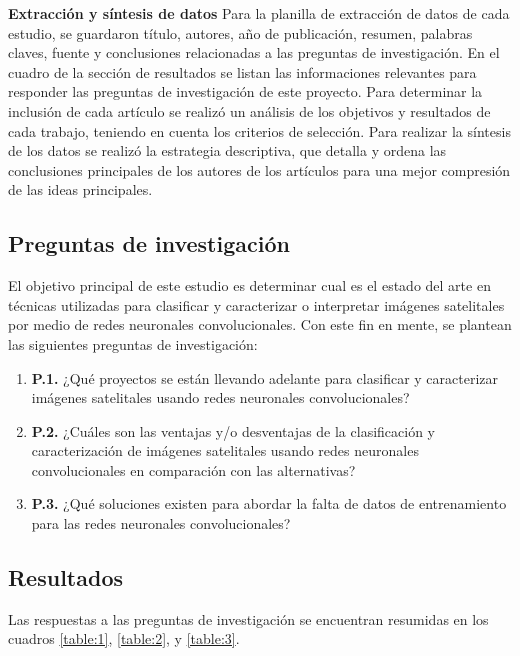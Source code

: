 {\bf Extracción y síntesis de datos} Para la planilla de extracción de datos de cada estudio, se guardaron título,
autores, año de publicación, resumen, palabras claves, fuente y conclusiones relacionadas a las preguntas de
investigación. En el cuadro de la sección de resultados se listan las informaciones relevantes para responder las
preguntas de investigación de este proyecto. Para determinar la inclusión de cada artículo se realizó un análisis de
los objetivos y resultados de cada trabajo, teniendo en cuenta los criterios de selección. Para realizar la síntesis de
los datos se realizó la estrategia descriptiva, que detalla y ordena las conclusiones principales de los autores de los
artículos para una mejor compresión de las ideas principales.

\subsection{Preguntas de investigación}

El objetivo principal de este estudio es determinar cual es el estado del arte en técnicas utilizadas para clasificar y
caracterizar o interpretar imágenes satelitales por medio de redes neuronales convolucionales. Con este fin en mente,
se plantean las siguientes preguntas de investigación:

\begin{enumerate}
    \item[] {\bf P.1.} ¿Qué proyectos se están llevando adelante para clasificar y caracterizar imágenes satelitales
        usando redes neuronales convolucionales?
    \item[] {\bf P.2.} ¿Cuáles son las ventajas y/o desventajas de la clasificación y caracterización de imágenes
        satelitales usando redes neuronales convolucionales en comparación con las alternativas?
    \item[] {\bf P.3.} ¿Qué soluciones existen para abordar la falta de datos de entrenamiento para las redes
        neuronales convolucionales?
\end{enumerate}

\subsection{Resultados}

Las respuestas a las preguntas de investigación se encuentran resumidas en los cuadros \ref{table:1}, \ref{table:2}, y
\ref{table:3}.

